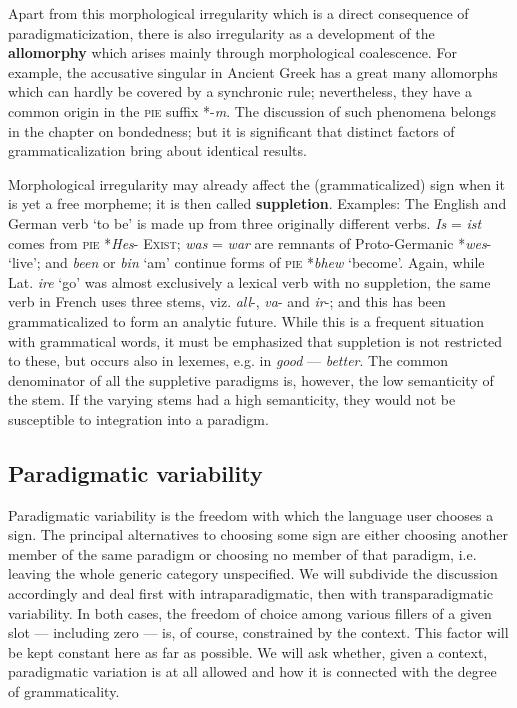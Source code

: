 Apart from this morphological irregularity which is a direct consequence of paradigmaticization, there is also irregularity as a development of the \textbf{allomorphy} which arises mainly through morphological coalescence. For example, the accusative singular in Ancient Greek has a great many allomorphs which can hardly be covered by a synchronic rule; nevertheless, they have a common origin in the \textsc{pie} suffix *-\textit{m}. The discussion of such phenomena belongs in the chapter on bondedness; but it is significant that distinct factors of grammaticalization bring about identical results.

Morphological irregularity may already affect the (grammaticalized) sign when it is yet a free morpheme; it is then called \textbf{suppletion}. Examples: The English and German verb ‘to be’ is made up from three originally different verbs. \textit{Is} = \textit{ist} comes from \textsc{pie} *\textit{Hes}{}- \textsc{Exist}; \textit{was} = \textit{war} are remnants of Proto-Germanic *\textit{wes}{}- ‘live’; and \textit{been} or \textit{bin} ‘am’ continue forms of \textsc{pie} *\textit{bhew} ‘become’. Again, while Lat. \textit{ire} ‘go’ was almost exclusively a lexical verb with no suppletion, the same verb in French uses three stems, viz. \textit{all}{}-, \textit{va}{}- and \textit{ir}{}-; and this has been grammaticalized to form an analytic future. While this is a frequent situation with grammatical words, it must be emphasized that suppletion is not restricted to these, but occurs also in lexemes, e.g. in \textit{good} — \textit{better}. The common denominator of all the suppletive paradigms is, however, the low semanticity of the stem. If the varying stems had a high semanticity, they would not be susceptible to integration into a paradigm.

\subsection{Paradigmatic variability} \label{sec:4.2.3}

Paradigmatic variability is the freedom with which the language user chooses a sign. The principal alternatives to choosing some sign are either choosing another member of the same paradigm or choosing no member of that paradigm, i.e. leaving the whole generic category unspecified. We will subdivide the discussion accordingly and deal first with intraparadigmatic, then with transparadigmatic variability. In both cases, the freedom of choice among various fillers of a given slot — including zero — is, of course, constrained by the context. This factor will be kept constant here as far as possible. We will ask whether, given a context, paradigmatic variation is at all allowed and how it is connected with the degree of grammaticality.

